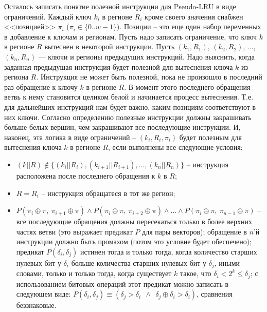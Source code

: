 \documentclass[14pt]{extreport}
\newcommand{\PseudoLRU}{\textsf{Pseudo-LRU}\xspace}
\begin{document}
Осталось записать понятие полезной инструкции для \PseudoLRU в виде
ограничений. Каждый ключ $k_i$ в регионе $R_i$ кроме своего значения
снабжен <<позицией>> $\pi_i$ ($\pi_i \in \{0..w{-}1\})$. Позиции -- это еще один
набор переменных в добавление к ключам и регионам. Пусть надо записать
ограничение, что ключ $k$ в регионе $R$ вытеснен в некоторой инструкции. Пусть
$(k_1, R_1)$, $(k_2, R_2)$, ..., $(k_n, R_n)$ --- ключи и регионы предыдущих
инструкций. Надо выяснить, когда заданная предыдущая инструкция будет полезной
для вытеснения ключа $k$ из региона $R$. Инструкция не может быть полезной, пока
не произошло в последний раз обращение к ключу $k$ в регионе $R$. В момент этого
последнего обращения ветвь к нему становится целиком белой и начинается процесс
вытеснения. Т.е. для дальнейших инструкций нам будет важно, каким позициям
соответствуют в них ключи. Согласно определению полезные инструкции должны
закрашивать больше белых вершин, чем закрашивают все последующие инструкции. И,
наконец, эта логика в виде ограничений -- $(k_i, R_i, \pi_i)$ будет полезным для
вытеснения ключа $k$ в регионе $R$, если выполнены все следующие условия:
\begin{itemize}
    \item $(k||R) \notin \{(k_i||R_i), (k_{i+1}||R_{i+1}), ..., (k_n||R_n)\}$ --
инструкция расположена после последнего обращения к $k$ в $R$;
    \item $R = R_i$ -- инструкция обращатеся в тот же регион;
    \item $P(\pi_i \oplus \pi,~\pi_{i+1} \oplus \pi) \wedge P(\pi_i \oplus
\pi,~\pi_{i+2} \oplus \pi) \wedge ... \wedge P(\pi_i \oplus \pi,~\pi_{n-1}
\oplus \pi)$ -- все последующие обращения должны пересекаться только в более
верхних частях ветви (это выражает предикат $P$ для пары векторов); обращение в
$n$'й инструкции должно быть промахом (потом это условие будет обеспечено);
предикат $P(\delta_i, \delta_j)$ истинен тогда и только тогда, когда количество
старших нулевых бит у $\delta_i$ больше количества старших нулевых бит у
$\delta_j$, иными словами, только и только тогда, когда существует $k$ такое,
что $\delta_i < 2^k \leqslant \delta_j$; с использованием битовых операций этот
предикат можно записать в следующем виде: $P(\delta_i, \delta_j) \equiv
(\delta_j > \delta_i~~\wedge~~\delta_j \oplus \delta_i > \delta_i)$, сравнения
беззнаковые.
\end{itemize}
\end{document}
